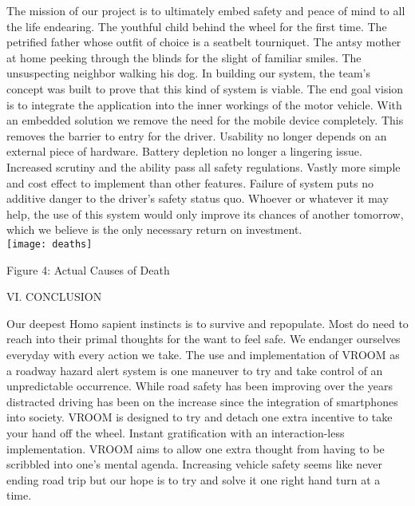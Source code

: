 \documentclass[11pt]{article}
\begin{document}
\begin{multicols}{2}
The mission of our project is to ultimately embed safety and peace of mind to all the life endearing. The youthful child behind the wheel for the first time. The petrified father whose outfit of choice is a seatbelt tourniquet. The antsy mother at home peeking through the blinds for the slight of familiar smiles. The unsuspecting neighbor walking his dog. In building our system, the team’s concept was built to prove that this kind of system is viable. The end goal vision is to integrate the application into the inner workings of the motor vehicle. With an embedded solution we remove the need for the mobile device completely. This removes the barrier to entry for the driver. Usability no longer depends on an external piece of hardware. Battery depletion no longer a lingering issue. Increased scrutiny and the ability pass all safety regulations. Vastly more simple and cost effect to implement than other features. Failure of system puts no additive danger to the driver’s safety status quo. Whoever or whatever it may help, the use of this system would only improve its chances of another tomorrow, which we believe is the only necessary return on investment.
\\
\texttt{[image: deaths]}
\begin{center}
{\footnotesize Figure 4: Actual Causes of Death}
\end{center}
\begin{center}
	VI. CONCLUSION
\end{center}
Our deepest Homo sapient instincts is to survive and repopulate. Most do need to reach into their primal thoughts for the want to feel safe. We endanger ourselves everyday with every action we take. The use and implementation of VROOM as a roadway hazard alert system is one maneuver to try and take control of an unpredictable occurrence. While road safety has been improving over the years distracted driving has been on the increase since the integration of smartphones into society. VROOM is designed to try and detach one extra incentive to take your hand off the wheel. Instant gratification with an interaction-less implementation. VROOM aims to allow one extra thought from having to be scribbled into one's mental agenda. Increasing vehicle safety seems like never ending road trip but our hope is to try and solve it one right hand turn at a time.


\end{multicols}
\end{document}
